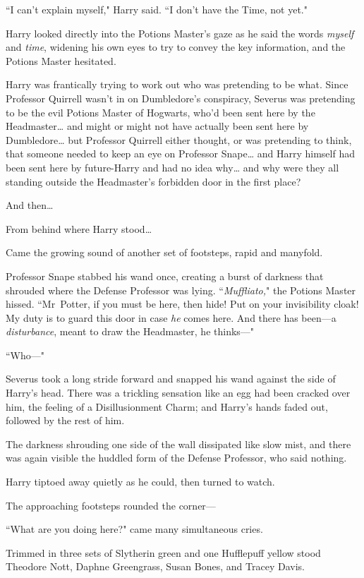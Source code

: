 ``I can't explain myself," Harry said. ``I don't have the Time, not yet."

Harry looked directly into the Potions Master's gaze as he said the words \emph{myself} and \emph{time}, widening his own eyes to try to convey the key information, and the Potions Master hesitated.

Harry was frantically trying to work out who was pretending to be what. Since Professor Quirrell wasn't in on Dumbledore's conspiracy, Severus was pretending to be the evil Potions Master of Hogwarts, who'd been sent here by the Headmaster{\ldots} and might or might not have actually been sent here by Dumbledore{\ldots} but Professor Quirrell either thought, or was pretending to think, that someone needed to keep an eye on Professor Snape{\ldots} and Harry himself had been sent here by future-Harry and had no idea why{\ldots} and why were they all standing outside the Headmaster's forbidden door in the first place?

And then{\ldots}

From behind where Harry stood{\ldots}

Came the growing sound of another set of footsteps, rapid and manyfold.

Professor Snape stabbed his wand once, creating a burst of darkness that shrouded where the Defense Professor was lying. ``\emph{Muffliato,}" the Potions Master hissed. ``Mr~Potter, if you must be here, then hide! Put on your invisibility cloak! My duty is to guard this door in case \emph{he} comes here. And there has been—a \emph{disturbance}, meant to draw the Headmaster, he thinks—"

``Who—"

Severus took a long stride forward and snapped his wand against the side of Harry's head. There was a trickling sensation like an egg had been cracked over him, the feeling of a Disillusionment Charm; and Harry's hands faded out, followed by the rest of him.

The darkness shrouding one side of the wall dissipated like slow mist, and there was again visible the huddled form of the Defense Professor, who said nothing.

Harry tiptoed away quietly as he could, then turned to watch.

The approaching footsteps rounded the corner—

``What are you doing here?" came many simultaneous cries.

Trimmed in three sets of Slytherin green and one Hufflepuff yellow stood Theodore Nott, Daphne Greengrass, Susan Bones, and Tracey Davis.


